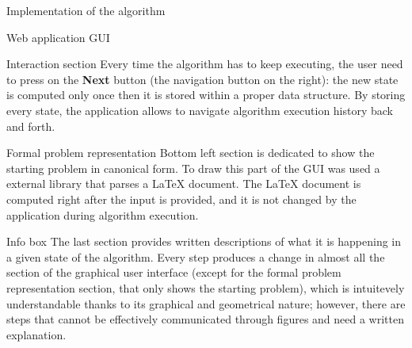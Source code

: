 \documentclass[9pt]{extarticle}
\begin{document}
\begin{section}{Implementation of the algorithm}
\begin{subsection}{Web application GUI}
\begin{subsubsection}{Interaction section}
                Every time the algorithm has to keep executing, the user need to press on the \textbf{Next} button (the navigation button on the 
                right): the new state is computed only once then it is stored within a proper data structure. 
                By storing every state, the application allows to navigate algorithm execution history back and forth.

            \end{subsubsection}

            \begin{subsubsection}{Formal problem representation}
                Bottom left section is dedicated to show the starting problem in canonical form. 
                To draw this part of the GUI was used a external library that parses a LaTeX document.
                The LaTeX document is computed right after the input is provided, and it is not changed by the application during algorithm execution.
            \end{subsubsection}

            \begin{subsubsection}{Info box}
                The last section provides written descriptions of what it is happening in a given state of the algorithm.
                Every step produces a change in almost all the section of the graphical user interface (except for the formal problem representation 
                section, that only shows the starting problem), which is intuitevely understandable thanks to its graphical and geometrical nature; 
                however, there are steps that cannot be effectively communicated through figures and need a written explanation.
            \end{subsubsection}
        \end{subsection}
    \end{section}
\end{document}
